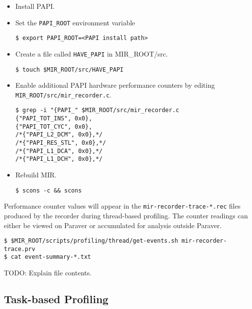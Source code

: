 \documentclass[11pt,a4paper]{article}
\begin{document}
\begin{itemize}
\item Install PAPI.
\item Set the \texttt{PAPI\_ROOT} environment variable

\begin{lstlisting}[style=MyInputStyle]
$ export PAPI_ROOT=<PAPI install path>
\end{lstlisting}

\item Create a file called \texttt{HAVE\_PAPI} in MIR\_ROOT/src.

\begin{lstlisting}[style=MyInputStyle]
$ touch $MIR_ROOT/src/HAVE_PAPI
\end{lstlisting}

\item Enable additional PAPI hardware performance counters by editing \texttt{MIR\_ROOT/src/mir\_recorder.c}.

\begin{lstlisting}[style=MyInputStyle]
$ grep -i "{PAPI_" $MIR_ROOT/src/mir_recorder.c
{"PAPI_TOT_INS", 0x0},
{"PAPI_TOT_CYC", 0x0},
/*{"PAPI_L2_DCM", 0x0},*/
/*{"PAPI_RES_STL", 0x0},*/
/*{"PAPI_L1_DCA", 0x0},*/
/*{"PAPI_L1_DCH", 0x0},*/
\end{lstlisting}

\item Rebuild MIR.

\begin{lstlisting}[style=MyInputStyle]
$ scons -c && scons
\end{lstlisting}
\end{itemize}

Performance counter values will appear in the \texttt{mir-recorder-trace-*.rec} files produced by the recorder during thread-based profiling. The counter readings can either be viewed on Paraver or accumulated for analysis outside Paraver.

\begin{lstlisting}[style=MyInputStyle]
$ $MIR_ROOT/scripts/profiling/thread/get-events.sh mir-recorder-trace.prv
$ cat event-summary-*.txt
\end{lstlisting}

TODO: Explain file contents.

\subsection{Task-based Profiling}\label{task-based-profiling}
\end{document}
